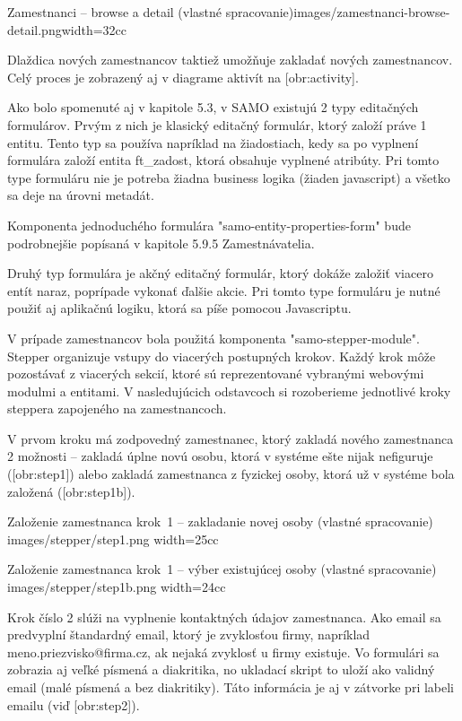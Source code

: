 {Zamestnanci -- browse a detail (vlastné spracovanie)}{images/zamestnanci-browse-detail.png}{width=32cc} 

Dlaždica nových zamestnancov taktiež umožňuje zakladať nových zamestnancov. Celý proces je zobrazený aj v diagrame aktivít na [obr:activity]. 

Ako bolo spomenuté aj v kapitole 5.3, v  SAMO existujú 2 typy editačných formulárov. Prvým z nich je klasický editačný formulár, ktorý založí práve 1 entitu. Tento typ sa používa napríklad na žiadostiach, kedy sa po vyplnení formulára založí entita ft\_zadost, ktorá obsahuje vyplnené atribúty. Pri tomto type formuláru nie je potreba žiadna business logika (žiaden javascript) a všetko sa deje na úrovni metadát. 

Komponenta jednoduchého formulára "samo-entity-properties-form" bude podrobnejšie popísaná v kapitole 5.9.5 Zamestnávatelia.

Druhý typ formulára je akčný editačný formulár, ktorý dokáže založiť viacero entít naraz, poprípade vykonať ďalšie akcie. Pri tomto type formuláru je nutné použiť aj aplikačnú logiku, ktorá sa píše pomocou Javascriptu. 

V prípade zamestnancov bola použitá komponenta "samo-stepper-module". Stepper organizuje vstupy do viacerých postupných krokov. Každý krok môže pozostávať z viacerých sekcií, ktoré sú reprezentované vybranými webovými modulmi a entitami. V nasledujúcich odstavcoch si rozoberieme jednotlivé kroky steppera zapojeného na zamestnancoch.

\blank
V prvom kroku má zodpovedný zamestnanec, ktorý zakladá nového zamestnanca 2 možnosti -- zakladá úplne novú osobu, ktorá v systéme ešte nijak nefiguruje ([obr:step1]) alebo zakladá zamestnanca z  fyzickej osoby, ktorá už v systéme bola založená ([obr:step1b]).

{Založenie zamestnanca krok~1 -- zakladanie novej osoby (vlastné spracovanie)}
{images/stepper/step1.png}
{width=25cc} 

{Založenie zamestnanca krok~1 -- výber existujúcej osoby (vlastné spracovanie)}
{images/stepper/step1b.png}
{width=24cc} 

Krok číslo 2 slúži na vyplnenie kontaktných údajov zamestnanca. Ako email sa predvyplní štandardný email, ktorý je zvyklosťou firmy, napríklad meno.priezvisko@firma.cz, ak nejaká zvyklosť u firmy existuje. Vo formulári sa zobrazia aj veľké písmená a diakritika, no ukladací skript to uloží ako validný email (malé písmená a bez diakritiky). Táto informácia je aj v zátvorke pri labeli emailu (viď [obr:step2]).

